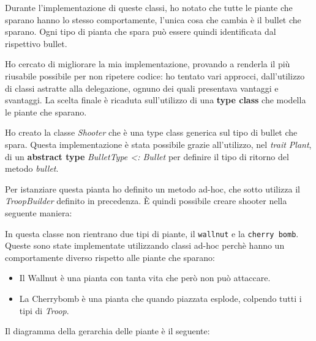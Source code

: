 Durante l'implementazione di queste classi, ho notato che tutte le piante che sparano hanno lo stesso comportamente, l'unica cosa che cambia è il bullet che sparano.
Ogni tipo di pianta che spara può essere quindi identificata dal rispettivo bullet.

Ho cercato di migliorare la mia implementazione, provando a renderla il più riusabile possibile per non ripetere codice: ho tentato vari approcci, dall'utilizzo di classi astratte alla delegazione, ognuno dei quali presentava vantaggi e svantaggi.
La scelta finale è ricaduta sull'utilizzo di una \textbf{type class} che modella le piante che sparano.

Ho creato la classe \textit{Shooter} che è una type class generica sul tipo di bullet che spara.
Questa implementazione è stata possibile grazie all'utilizzo, nel \textit{trait Plant}, di un \textbf{abstract type} \textit{BulletType \textless: Bullet} per definire il tipo di ritorno del metodo \textit{bullet}.



Per istanziare questa pianta ho definito un metodo ad-hoc, che sotto utilizza il \textit{TroopBuilder} definito in precedenza.
È quindi possibile creare shooter nella seguente maniera:



In questa classe non rientrano due tipi di piante, il \texttt{wallnut} e la \texttt{cherry bomb}.
Queste sono state implementate utilizzando classi ad-hoc perchè hanno un comportamente diverso rispetto alle piante che sparano:
\begin{itemize}
    \item Il Wallnut è una pianta con tanta vita che però non può attaccare.
    \item La Cherrybomb è una pianta che quando piazzata esplode, colpendo tutti i tipi di \textit{Troop}.
\end{itemize}

Il diagramma della gerarchia delle piante è il seguente:

